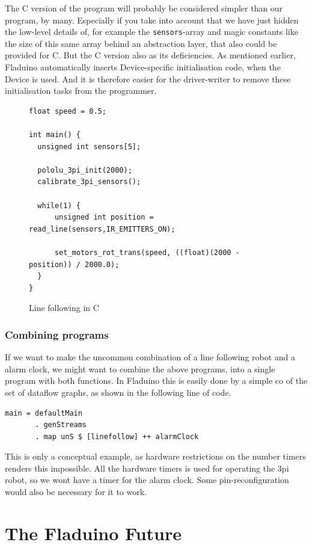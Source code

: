 \documentclass[a4paper, oneside, final]{memoir}
\begin{document}
The C version of the program will probably be considered simpler than
our program, by many. Especially if you take into account that we have
just hidden the low-level details of, for example the
\verb|sensors|-array and magic constants like the size of this same
array behind an abstraction layer, that also could be provided for C.
But the C version also as its deficiencies. As mentioned earlier,
Fladuino automatically inserts Device-specific initialisation code,
when the Device is used. And it is therefore easier for the
driver-writer to remove these initialisation tasks from the
programmer. 

\begin{figure}
  \centering
\begin{verbatim}
float speed = 0.5;

int main() {
  unsigned int sensors[5];

  pololu_3pi_init(2000);
  calibrate_3pi_sensors();

  while(1) {
      unsigned int position = read_line(sensors,IR_EMITTERS_ON);

      set_motors_rot_trans(speed, ((float)(2000 - position)) / 2000.0);
  }
}
\end{verbatim}
  \caption{Line following in C}
  \label{fig:linefollow-in-c}
\end{figure}

\subsection{Combining programs}
If we want to make the uncommon combination of a line following robot
and a alarm clock, we might want to combine the above programs, into a
single program with both functions. In Fladuino this is easily done by
a simple co of the set of dataflow graphs, as shown in the
following line of code.

\begin{verbatim}
main = defaultMain
       . genStreams
       . map unS $ [linefollow] ++ alarmClock
\end{verbatim}

This is only a conceptual example, as hardware restrictions on the
number timers renders this impossible. All the hardware timers is used
for operating the 3pi robot, so we wont have a timer for the alarm
clock. Some pin-reconfiguration would also be necessary for it to
work.


\chapter{The Fladuino Future}
\label{chap:futurework}
\end{document}
